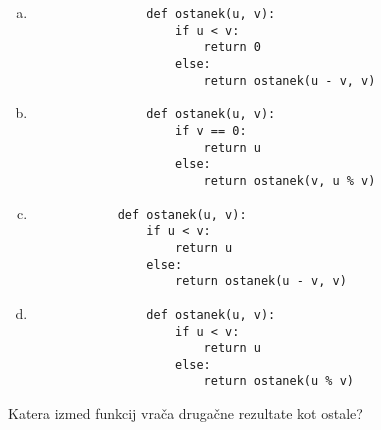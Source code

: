 \documentclass[arhiv, 10pt]{../izpit}
\begin{document}
        \begin{multicols}{2}
        \begin{enumerate}[(a)]
\item 
                \begin{verbatim}
                def ostanek(u, v):
                    if u < v:
                        return 0
                    else:
                        return ostanek(u - v, v)
                \end{verbatim}
            
\item 
                \begin{verbatim}
                def ostanek(u, v):
                    if v == 0:
                        return u
                    else:
                        return ostanek(v, u % v)
                \end{verbatim}
            
\item 
            \begin{verbatim}
            def ostanek(u, v):
                if u < v:
                    return u
                else:
                    return ostanek(u - v, v)
            \end{verbatim}
        
\item 
                \begin{verbatim}
                def ostanek(u, v):
                    if u < v:
                        return u
                    else:
                        return ostanek(u % v)
                \end{verbatim}
            
\end{enumerate}

        \end{multicols}
    
        \naloga*
        
        Katera izmed funkcij vrača drugačne rezultate kot ostale?
    
\end{document}
